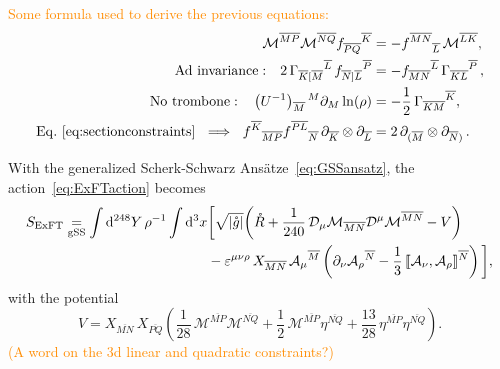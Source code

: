 \documentclass[a4paper, 11pt]{article}
\numberwithin{equation}{section}
\newcommand{\ff}[1]{\mathfrak{#1}}
\newcommand{\ov}[1]{\overline{#1}}
\newcommand{\+}{\oplus}
\newcommand{\gL}{\mathcal{L}}
\newcommand{\cU}{{\cal U}}
\newcommand{\UI}{\left(U^{-1}\right)}
\newcommand{\fl}[1]{\ov{#1}}
\newcommand{\M}{\ensuremath{\mathcal{M}}\xspace}
\newcommand{\A}{\ensuremath{\mathcal{A}}\xspace}
\renewcommand{\d}{\ensuremath{\mathrm{d}}\xspace}
\newcommand{\CE}[1]{\textcolor{darkorange}{#1}}
\begin{document}
\CE{Some formula used to derive the previous equations:
\begin{equation}
	\begin{aligned}
		\M^{\fl{MP}}\M^{\fl{NQ}}f_{\fl{PQ}}{}^{\fl{K}}&=-f^{\fl{MN}}{}_{\fl{L}}\,\M^{\fl{LK}},\\
		{\rm Ad\ invariance:}\quad 2\,\Gamma_{\fl{K}[\fl{M}}{}^{\fl{L}}\,f_{\fl{N}]\fl{L}}{}^{\fl{P}}&= -f_{\fl{MN}}{}^{\fl{L}}\,\Gamma_{\fl{KL}}{}^{\fl{P}}\,,\\
		{\rm No\ trombone:}\quad \UI_{\fl{M}}{}^{M}\partial_{M}\ln(\rho)&= -\frac{1}{2}\,\Gamma_{\fl{KM}}{}^{\fl{K}},\\
		{\rm Eq.~\eqref{eq:sectionconstraints}}\ \implies \ f^{\fl{K}}{}_{\fl{MP}}f^{\fl{PL}}{}_{\fl{N}}\,\partial_{\fl{K}}\otimes\partial_{\fl{L}} &= 2\,\partial_{(\fl{M}}\otimes\partial_{\fl{N})}\,.
	\end{aligned}
\end{equation}
}



With the generalized Scherk-Schwarz Ansätze~\eqref{eq:GSSansatz}, the action~\eqref{eq:ExFTaction} becomes
\begin{equation} \label{eq:ExFTactiongSS}
	\begin{aligned}
		S_{\rm ExFT} \underset{\rm gSS}{=} \int\d^{248}Y\,\rho^{-1}\int \d^{3}x & \bigg[\sqrt{\vert\mathring{g}\vert}\bigg(\mathring{R}+\frac{1}{240}\,{\cal D}_{\mu}\M_{\fl{MN}}{\cal D}^{\mu}\M^{\fl{MN}}-V\bigg) \\
		&-\varepsilon^{\mu\nu\rho}\,X_{\fl{MN}}\,\A_{\mu}{}^{\fl{M}} \left(\partial_{\nu}\A_{\rho}{}^{\fl{N}}-\frac{1}{3}\,\llbracket\A_{\nu},\A_{\rho}\rrbracket^{\fl{N}}\right)\bigg],
	\end{aligned}
\end{equation}
with the potential%
\begin{equation}
	V = X_{\fl{MN}}\,X_{\fl{PQ}}\left(\frac{1}{28}\,\M^{\fl{MP}}\M^{\fl{NQ}}+\frac{1}{2}\,\M^{\fl{MP}}\eta^{\fl{NQ}}+\frac{13}{28}\,\eta^{\fl{MP}}\eta^{\fl{NQ}}\right).
\end{equation}
\CE{(A word on the 3d linear and quadratic constraints?)}
\end{document}
